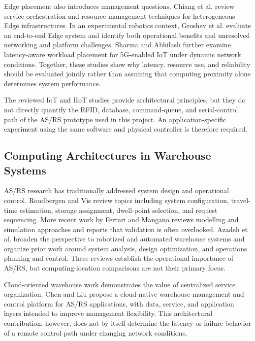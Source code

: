 \documentclass[conference]{IEEEtran}
\begin{document}
Edge placement also introduces management questions. Chiang et al. \cite{chiang2023} review service orchestration and resource-management techniques for heterogeneous Edge infrastructures. In an experimental robotics context, Groshev et al. \cite{groshev2023} evaluate an end-to-end Edge system and identify both operational benefits and unresolved networking and platform challenges. Sharma and Abhilash \cite{sharma2025} further examine latency-aware workload placement for 5G-enabled IoT under dynamic network conditions. Together, these studies show why latency, resource use, and reliability should be evaluated jointly rather than assuming that computing proximity alone determines system performance.

The reviewed IoT and IIoT studies provide architectural principles, but they do not directly quantify the RFID, database, command-queue, and serial-control path of the AS/RS prototype used in this project. An application-specific experiment using the same software and physical controller is therefore required.

\subsection{Computing Architectures in Warehouse Systems}
AS/RS research has traditionally addressed system design and operational control. Roodbergen and Vis \cite{roodbergen2009} review topics including system configuration, travel-time estimation, storage assignment, dwell-point selection, and request sequencing. More recent work by Ferrari and Mangano \cite{ferrari2023} reviews modelling and simulation approaches and reports that validation is often overlooked. Azadeh et al. \cite{azadeh2019} broaden the perspective to robotized and automated warehouse systems and organize prior work around system analysis, design optimization, and operations planning and control. These reviews establish the operational importance of AS/RS, but computing-location comparisons are not their primary focus.

Cloud-oriented warehouse work demonstrates the value of centralized service organization. Chen and Liu \cite{chen2024} propose a cloud-native warehouse management and control platform for AS/RS applications, with data, service, and application layers intended to improve management flexibility. This architectural contribution, however, does not by itself determine the latency or failure behavior of a remote control path under changing network conditions.
\end{document}
